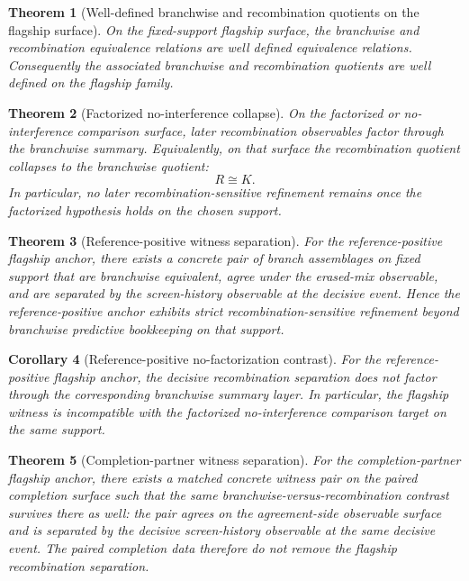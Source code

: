 \documentclass[11pt]{article}
\newtheorem{theorem}{Theorem}[section]
\newtheorem{corollary}[theorem]{Corollary}
\theoremstyle{definition}
\begin{document}
\begin{theorem}[Well-defined branchwise and recombination quotients on the flagship surface]
\label{thm:flagship-setoids}
On the fixed-support flagship surface, the branchwise and recombination equivalence relations are well defined equivalence relations. Consequently the associated branchwise and recombination quotients are well defined on the flagship family.
\end{theorem}

\begin{theorem}[Factorized no-interference collapse]
\label{thm:factorized-collapse}
On the factorized or no-interference comparison surface, later recombination observables factor through the branchwise summary. Equivalently, on that surface the recombination quotient collapses to the branchwise quotient:
\[
R \cong K.
\]
In particular, no later recombination-sensitive refinement remains once the factorized hypothesis holds on the chosen support.
\end{theorem}

\begin{theorem}[Reference-positive witness separation]
\label{thm:reference-positive-witness}
For the reference-positive flagship anchor, there exists a concrete pair of branch assemblages on fixed support that are branchwise equivalent, agree under the erased-mix observable, and are separated by the screen-history observable at the decisive event. Hence the reference-positive anchor exhibits strict recombination-sensitive refinement beyond branchwise predictive bookkeeping on that support.
\end{theorem}

\begin{corollary}[Reference-positive no-factorization contrast]
\label{cor:reference-positive-no-factorization}
For the reference-positive flagship anchor, the decisive recombination separation does not factor through the corresponding branchwise summary layer. In particular, the flagship witness is incompatible with the factorized no-interference comparison target on the same support.
\end{corollary}

\begin{theorem}[Completion-partner witness separation]
\label{thm:completion-partner-witness}
For the completion-partner flagship anchor, there exists a matched concrete witness pair on the paired completion surface such that the same branchwise-versus-recombination contrast survives there as well: the pair agrees on the agreement-side observable surface and is separated by the decisive screen-history observable at the same decisive event. The paired completion data therefore do not remove the flagship recombination separation.
\end{theorem}
\end{document}
